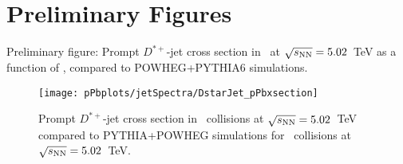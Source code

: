 

\section{Preliminary Figures}

Preliminary figure: Prompt $D^{*+}$-jet cross section in \pPb\ at $\sqrt{s_{\rm NN}}=5.02$~TeV as a function of \ptchjet, compared to POWHEG+PYTHIA6 simulations.


\begin{figure}[bth]
\centering
\texttt{[image: pPbplots/jetSpectra/DstarJet\_pPbxsection]}
\caption{Prompt $D^{*+}$-jet cross section in \pPb\ collisions at $\sqrt{s_{\rm NN}}=5.02$~TeV compared to PYTHIA+POWHEG simulations for \pPb\ collisions at $\sqrt{s_{\rm NN}}=5.02$~TeV.}
\label{fig:pPbJetPt_final_wpp}
\end{figure}



{}


